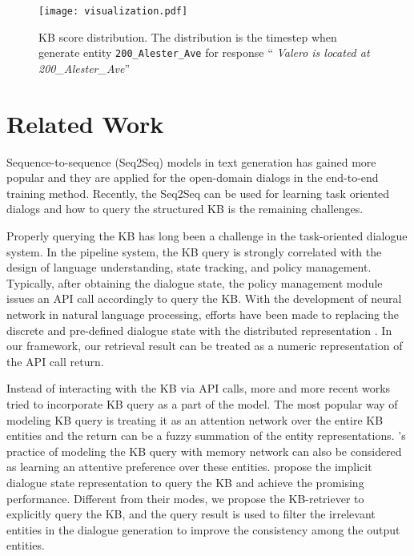\documentclass[11pt,a4paper]{article}
\begin{document}
\begin{figure}[t]
	\centering
	
\texttt{[image: visualization.pdf]}
	\caption{
		KB score distribution.
		The distribution is the timestep when generate entity \texttt{200\_Alester\_Ave} for response ``	\textit{Valero is located at 200\_Alester\_Ave}''
	}
	\label{fig:visual}
\end{figure}

\section{Related Work}
Sequence-to-sequence (Seq2Seq) models 
in text generation \cite{sutskever2014sequence,bahdanau2014neural,luong-pham-manning:2015:EMNLP,K16-1028,nallapati2016sequence} has gained more popular and they are applied for the open-domain dialogs \cite{vinyals2015neural, serban2016building} in the end-to-end training method. Recently, the Seq2Seq can be used for learning task oriented dialogs and
how to query the structured KB is the remaining challenges.

Properly querying the KB has long been
a challenge in the task-oriented dialogue system.
In the pipeline system, the KB query
is strongly correlated with the design
of language understanding, state tracking, and policy management.
Typically, after obtaining the dialogue state,
the policy management module issues an API call accordingly
to query the KB.
With the development of neural network in natural language processing,
efforts have been made to replacing the
discrete and pre-defined dialogue state
with the distributed representation
\cite{bordes-weston:2017:ICLR,wen:2017:EACL,wen:2017:ICML,liu:2017:interspeech}.
In our framework, our retrieval result can be treated
as a numeric representation of the API call return. 

Instead of interacting with the KB via API calls,
more and more recent works tried to incorporate KB query
as a part of the model.
The most popular way of modeling KB query
is treating it as an attention network over the entire KB entities \cite{eric:2017:SIGDial,dhingra:2017:ACL,reddy2018multi,raghu-etal-2019-disentangling,wu2019global}
and the return can be a fuzzy summation of the entity representations.
's practice of
modeling the KB query with memory network can also be considered
as learning an attentive preference over these entities.
 propose the implicit dialogue state representation to query the KB and achieve the promising performance.
Different from their modes, we propose the KB-retriever to explicitly query the KB, and the query result is used to filter the irrelevant entities in the dialogue generation to improve the consistency among the output entities.
\end{document}
